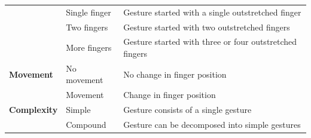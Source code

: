 \documentclass[sigchi]{acmart}
\begin{document}
\begin{table}[t]
\begin{center}
\begin{footnotesize}
\begin{tabular}{p{} p{} p{}}
										& Single finger		& Gesture started with a single outstretched finger \\
										& Two fingers		& Gesture started with two outstretched fingers \\
										& More fingers		& Gesture started with three or four outstretched fingers \\ \midrule
					\textbf{Movement}	& No movement		& No change in finger position \\
										& Movement			& Change in finger position \\ \midrule
					\textbf{Complexity}	& Simple			& Gesture consists of a single gesture \\
										& Compound			& Gesture can be decomposed into simple gestures \\ \bottomrule
				\end{tabular}
			\end{footnotesize}
		\end{center}
	\end{table}
\end{document}

